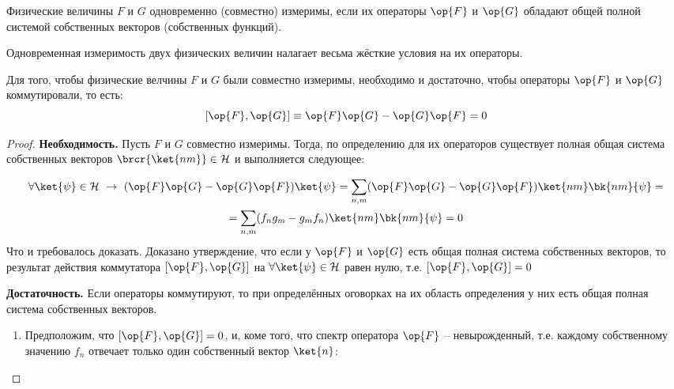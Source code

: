 \begin{defn}
Физические величины $F$ и $G$ одновременно (совместно) измеримы, если их операторы $\op{F}$ и $\op{G}$ обладают общей полной системой собственных векторов (собственных функций).
\end{defn}

Одновременная измеримость двух физических величин налагает весьма жёсткие условия на их операторы.

\begin{thm}\label{theorema_iv_chapter}
Для того, чтобы физические велчины $F$ и $G$ были совместно измеримы, необходимо и достаточно, чтобы операторы $\op{F}$ и $\op{G}$ коммутировали, то есть: 
$$[\op{F}, \op{G}] \equiv \op{F}\op{G} - \op{G}\op{F} = 0$$
\end{thm}

\begin{proof}

{\bf Необходимость.} Пусть $F$ и $G$ совместно измеримы. Тогда, по определению для их операторов существует полная общая система собственных векторов $\brcr{\ket{nm}} \in \mathcal{H}$ и выполняется следующее:

$$
\begin{gathered}
\forall \ket{\psi} \in \mathcal{H} ~\rightarrow ~
  (\op{F}\op{G} - \op{G}\op{F}) \ket{\psi} =
    \sum_{n,m} (\op{F}\op{G} - \op{G}\op{F}) \ket{nm}\bk{nm}{\psi} = \\ =
    \sum_{n,m} (f_n g_m - g_m f_n) \ket{nm}\bk{nm}{\psi} = 0
\end{gathered}
$$%
%
Что и требовалось доказать. Доказано утверждение, что если у $\op{F}$ и $\op{G}$ есть общая полная система собственных векторов, то результат действия коммутатора $[\op{F}, \op{G}]$ на $\forall \ket{\psi} \in \mathcal{H}$ равен нулю, т.е. $[\op{F}, \op{G}] = 0$

{\bf Достаточность.} Если операторы коммутируют, то при определённых оговорках на их область определения у них есть общая полная система собственных векторов.

\begin{enumerate}
\renewcommand\labelenumi{(\alph{enumi})}

\item Предположим, что $[\op{F}, \op{G}] = 0$, и, коме того, что спектр оператора $\op{F}$ -- невырожденный, т.е. каждому собственному значению $f_n$ отвечает только один собственный вектор $\ket{n}$:


\end{enumerate}
\end{proof}
